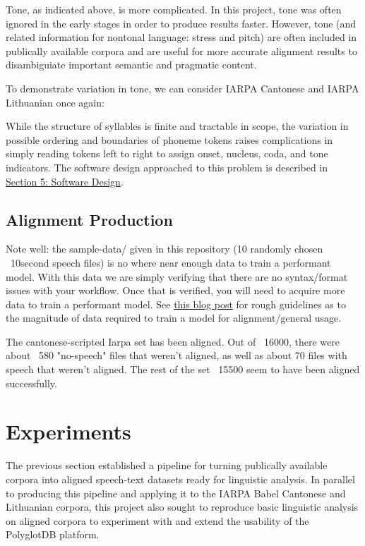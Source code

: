 \documentclass[11pt]{article}
\begin{document}
Tone, as indicated above, is more complicated. In this project, tone was often ignored in the early stages in order to produce results faster. However, tone (and related information for nontonal language: stress and pitch) are often included in publically available corpora and are useful for more accurate alignment results to disambiguiate important semantic and pragmatic content.

To demonstrate variation in tone, we can consider IARPA Cantonese and IARPA Lithuanian once again:


While the structure of syllables is finite and tractable in scope, the variation in possible ordering and boundaries of phoneme tokens raises complications in simply reading tokens left to right to assign onset, nucleus, coda, and tone indicators. The software design approached to this problem is described in \hyperlink{section.4}{Section 5: Software Design}.


\subsection{Alignment Production}

Note well: the sample-data/ given in this repository (10 randomly chosen ~10second speech files) is no where near enough data to train a performant model. With this data we are simply verifying that there are no syntax/format issues with your workflow. Once that is verified, you will need to acquire more data to train a performant model. See \href{https://memcauliffe.com/how-much-data-do-you-need-for-a-good-mfa-alignment.html}{this blog post} for rough guidelines as to the magnitude of data required to train a model for alignment/general usage.

The cantonese-scripted Iarpa set has been aligned. Out of ~16000, there were about ~580 "no-speech" files that weren't aligned, as well as about 70 files with speech that weren't aligned. The rest of the set ~15500 seem to have been aligned successfully.

\section{Experiments}

The previous section established a pipeline for turning publically available corpora into aligned speech-text datasets ready for linguistic analysis. In parallel to producing this pipeline and applying it to the IARPA Babel Cantonese and Lithuanian corpora, this project also sought to reproduce basic linguistic analysis on aligned corpora to experiment with and extend the usability of the PolyglotDB platform.
\end{document}
